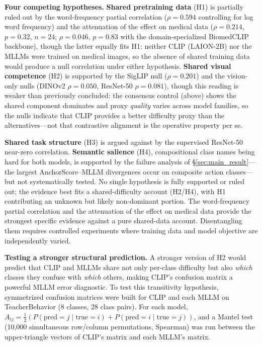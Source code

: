 \documentclass[11pt,a4paper]{article}
\begin{document}
\textbf{Four competing hypotheses.} \textbf{Shared pretraining data} (H1) is partially ruled out by the word-frequency partial correlation ($\rho=0.594$ controlling for log word frequency) and the attenuation of the effect on medical data ($\rho=0.214$, $p=0.32$, $n=24$; $\rho=0.046$, $p=0.83$ with the domain-specialized BiomedCLIP backbone), though the latter equally fits H1: neither CLIP (LAION-2B) nor the MLLMs were trained on medical images, so the absence of shared training data would produce a null correlation under either hypothesis. \textbf{Shared visual competence} (H2) is supported by the SigLIP null ($\rho=0.201$) and the vision-only nulls (DINOv2 $\rho=0.050$, ResNet-50 $\rho=0.081$), though this reading is weaker than previously concluded: the consensus control (above) shows the shared component dominates and proxy \emph{quality} varies across model families, so the nulls indicate that CLIP provides a better difficulty proxy than the alternatives---not that contrastive alignment is the operative property per se.

\textbf{Shared task structure} (H3) is argued against by the supervised ResNet-50 near-zero correlation. \textbf{Semantic salience} (H4), compositional class names being hard for both models, is supported by the failure analysis of \S\ref{sec:main_result}---the largest AnchorScore--MLLM divergences occur on composite action classes---but not systematically tested. No single hypothesis is fully supported or ruled out; the evidence best fits a shared-difficulty account (H2/H4), with H1 contributing an unknown but likely non-dominant portion. The word-frequency partial correlation and the attenuation of the effect on medical data provide the strongest specific evidence against a pure shared-data account. Disentangling them requires controlled experiments where training data and model objective are independently varied.

\textbf{Testing a stronger structural prediction.} A stronger version of H2 would predict that CLIP and MLLMs share not only per-class difficulty but also \emph{which} classes they confuse with \emph{which} others, making CLIP's confusion matrix a powerful MLLM error diagnostic. To test this transitivity hypothesis, symmetrized confusion matrices were built for CLIP and each MLLM on TeacherBehavior (8 classes, 28 class pairs). For each model, $A_{ij}=\tfrac{1}{2}(P(\text{pred}{=}j\!\mid\!\text{true}{=}i)+P(\text{pred}{=}i\!\mid\!\text{true}{=}j))$, and a Mantel test (10{,}000 simultaneous row/column permutations, Spearman) was run between the upper-triangle vectors of CLIP's matrix and each MLLM's matrix.
\end{document}
